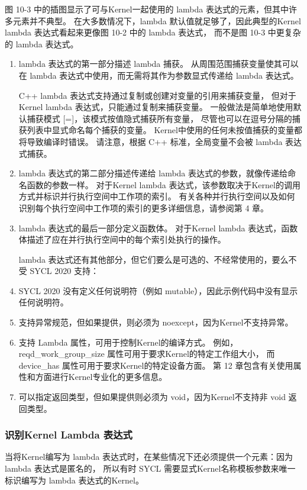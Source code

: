 图 10-3 中的插图显示了可与Kernel一起使用的 lambda 表达式的元素，但其中许多元素并不典型。 
在大多数情况下，lambda 默认值就足够了，因此典型的Kernel lambda 表达式看起来更像图 10-2 中的 lambda 表达式，
而不是图 10-3 中更复杂的 lambda 表达式。

\begin{enumerate}
	\item lambda 表达式的第一部分描述 lambda 捕获。 
	从周围范围捕获变量使其可以在 lambda 表达式中使用，而无需将其作为参数显式传递给 lambda 表达式。

	C++ lambda 表达式支持通过复制或创建对变量的引用来捕获变量，
	但对于Kernel lambda 表达式，只能通过复制来捕获变量。 
	一般做法是简单地使用默认捕获模式 [=]，该模式按值隐式捕获所有变量，
	尽管也可以在逗号分隔的捕获列表中显式命名每个捕获的变量。 
	Kernel中使用的任何未按值捕获的变量都将导致编译时错误。 
	请注意，根据 C++ 标准，全局变量不会被 lambda 表达式捕获。

	\item lambda 表达式的第二部分描述传递给 lambda 表达式的参数，就像传递给命名函数的参数一样。 
	对于Kernel lambda 表达式，该参数取决于Kernel的调用方式并标识并行执行空间中工作项的索引。 
	有关各种并行执行空间以及如何识别每个执行空间中工作项的索引的更多详细信息，请参阅第 4 章。

	\item lambda 表达式的最后一部分定义函数体。 
	对于Kernel lambda 表达式，函数体描述了应在并行执行空间中的每个索引处执行的操作。

	lambda 表达式还有其他部分，但它们要么是可选的、不经常使用的，要么不受 SYCL 2020 支持：

	\item SYCL 2020 没有定义任何说明符（例如 mutable），因此示例代码中没有显示任何说明符。

	\item 支持异常规范，但如果提供，则必须为 noexcept，因为Kernel不支持异常。

	\item 支持 Lambda 属性，可用于控制Kernel的编译方式。 
	例如，reqd\_work\_group\_size 属性可用于要求Kernel的特定工作组大小，
	而 device\_has 属性可用于要求Kernel的特定设备方面。 
	第 12 章包含有关使用属性和方面进行Kernel专业化的更多信息。

	\item 可以指定返回类型，但如果提供则必须为 void，因为Kernel不支持非 void 返回类型。
\end{enumerate}

\subsubsection{识别Kernel Lambda 表达式}
当将Kernel编写为 lambda 表达式时，在某些情况下还必须提供一个元素：因为 lambda 表达式是匿名的，
所以有时 SYCL 需要显式Kernel名称模板参数来唯一标识编写为 lambda 表达式的Kernel。

